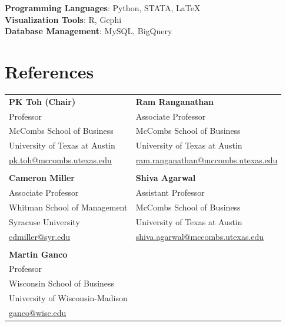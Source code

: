 \documentclass[a4paper,11pt]{article}
\begin{document}
\textbf{Programming Languages}{: Python, STATA, \LaTeX}
\\
\textbf{Visualization Tools}{: R, Gephi}
\\
\textbf{Database Management}{: MySQL, BigQuery}

\section{References}
\begin{tabular*}{\textwidth}{@{\extracolsep{\fill}} l l}
    \textbf{PK Toh (Chair)} & \textbf{Ram Ranganathan} \\
    Professor & Associate Professor \\
    McCombs School of Business & McCombs School of Business \\
    University of Texas at Austin & University of Texas at Austin \\
    \href{mailto:pk.toh@mccombs.utexas.edu}{pk.toh@mccombs.utexas.edu} & \href{mailto:ram.ranganathan@mccombs.utexas.edu}{ram.ranganathan@mccombs.utexas.edu} \\
    \\
    \textbf{Cameron Miller} & \textbf{Shiva Agarwal} \\
    Associate Professor & Assistant Professor \\
    Whitman School of Management & McCombs School of Business \\
    Syracuse University & University of Texas at Austin \\
    \href{mailto:cdmiller@syr.edu}{cdmiller@syr.edu} & 
    \href{mailto:shiva.agarwal@mccombs.utexas.edu}{shiva.agarwal@mccombs.utexas.edu} \\
    \\
    \textbf{Martin Ganco} \\
    Professor \\
    Wisconsin School of Business \\
    University of Wisconsin-Madison \\
    \href{mailto:ganco@wisc.edu}{ganco@wisc.edu}
\end{tabular*}

\end{document}
